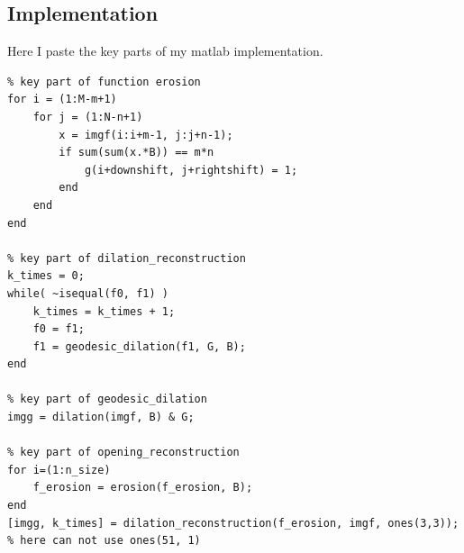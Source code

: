 \subsection{Implementation}
Here I paste the key parts of my matlab implementation.
\lstset{language=Matlab}
\begin{lstlisting}
% key part of function erosion
for i = (1:M-m+1)
    for j = (1:N-n+1)
        x = imgf(i:i+m-1, j:j+n-1);
        if sum(sum(x.*B)) == m*n
            g(i+downshift, j+rightshift) = 1;
        end
    end
end

% key part of dilation_reconstruction 
k_times = 0;
while( ~isequal(f0, f1) )
    k_times = k_times + 1;
    f0 = f1;
    f1 = geodesic_dilation(f1, G, B);
end

% key part of geodesic_dilation
imgg = dilation(imgf, B) & G;

% key part of opening_reconstruction
for i=(1:n_size)
    f_erosion = erosion(f_erosion, B);
end
[imgg, k_times] = dilation_reconstruction(f_erosion, imgf, ones(3,3)); % here can not use ones(51, 1)
\end{lstlisting}

\clearpage

